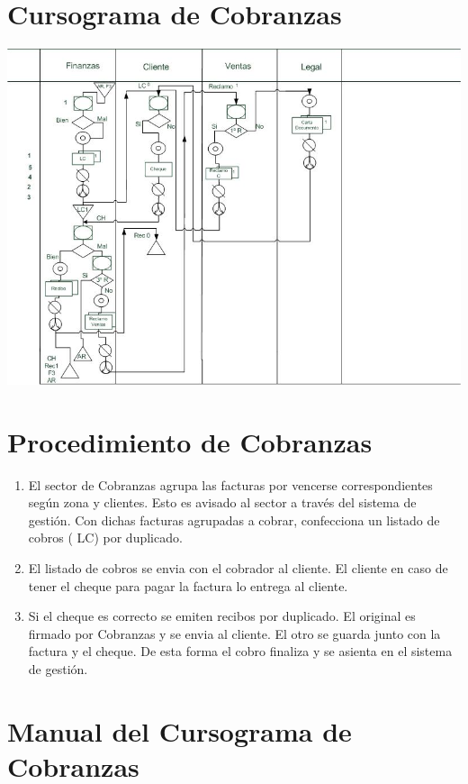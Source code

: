 \pagebreak
\section{Cursograma de Cobranzas}
\includegraphics[scale=0.7]{Empresa/Circuitos/Cobranzas/cursograma-manual-cobranzas.jpg}

\pagebreak
\section{Procedimiento de Cobranzas}
\begin{enumerate}
  \item El sector de Cobranzas agrupa las facturas por vencerse correspondientes seg\'un zona y clientes. Esto es avisado al sector a trav\'es del sistema de gesti\'on. Con dichas facturas agrupadas a cobrar, confecciona un listado de cobros ( LC) por duplicado.
  \item El listado de cobros se envia con el cobrador al cliente. El cliente en caso de tener el cheque para pagar la factura lo entrega al cliente.
  \item Si el cheque es correcto se emiten recibos por duplicado. El original es firmado por Cobranzas y se envia al cliente. El otro se guarda junto con la factura y el cheque. De esta forma el cobro finaliza y se asienta en el sistema de gesti\'on.
\end{enumerate}

\pagebreak
\section{Manual del Cursograma de Cobranzas}


